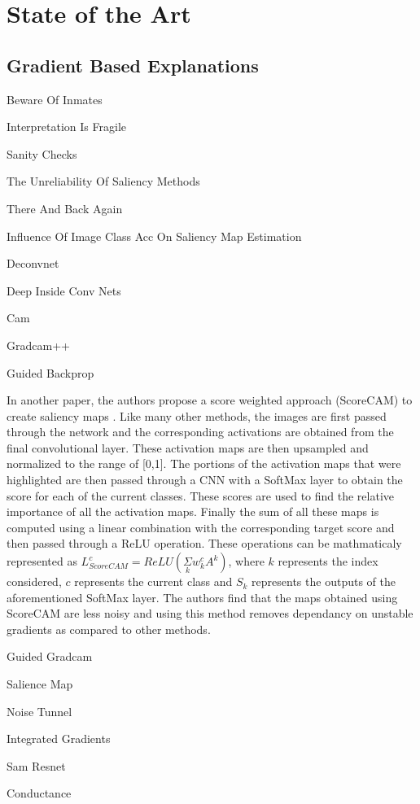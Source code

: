 \chapter{State of the Art}
\section{Gradient Based Explanations}
Beware Of Inmates

Interpretation Is Fragile

Sanity Checks

The Unreliability Of Saliency Methods

There And Back Again

Influence Of Image Class Acc On Saliency Map Estimation

Deconvnet

Deep Inside Conv Nets

Cam

Gradcam++

Guided Backprop

In another paper, the authors propose a score weighted approach (ScoreCAM) to create saliency maps \cite{wangScoreCAMScoreWeightedVisual2020}. Like many other methods, the images are first passed through the network and the corresponding activations are obtained from the final convolutional layer. These activation maps are then upsampled and normalized to the range of [0,1]. The portions of the activation maps that were highlighted are then passed through a CNN with a SoftMax layer to obtain the score for each of the current classes. These scores are used to find the relative importance of all the activation maps. Finally the sum of all these maps is computed using a linear combination with the corresponding target score and then passed through a ReLU operation. These operations can be mathmaticaly represented as $L^{c}_{ScoreCAM} = ReLU(\underset{k}\Sigma w_{k}^{c}A^{k})$, where $k$ represents the index considered, $c$ represents the current class and $S_k$ represents the outputs of the aforementioned SoftMax layer. The authors find that the maps obtained using ScoreCAM are less noisy and using this method removes dependancy on unstable gradients as compared to other methods.

Guided Gradcam

Salience Map

Noise Tunnel

Integrated Gradients

Sam Resnet

Conductance

